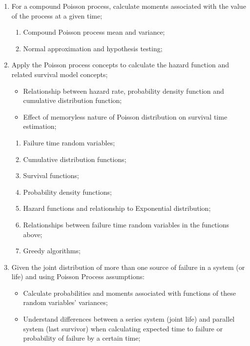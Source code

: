 \documentclass[12pt, titlepage, french]{report}
\begin{document}
\begin{outcomes}
\begin{enumerate}
\begin{knowledge}
\begin{enumerate}[label = \alph*.]
	\end{enumerate}
	\end{knowledge}
\tcbline
	\item	For a compound Poisson process, calculate moments associated with the value of the process at a given time;
	\begin{knowledge}
	\begin{enumerate}[label = \alph*.]
		\item	Compound Poisson process mean and variance;
		\item	Normal approximation and hypothesis testing;
	\end{enumerate}
	\end{knowledge}
\tcbline
	\item	Apply the Poisson process concepts to calculate the hazard function and related survival model concepts;
		\begin{itemize}
		\item	Relationship between hazard rate, probability density function and cumulative distribution function;
		\item	Effect of memoryless nature of Poisson distribution on survival time estimation;
		\end{itemize}
	\begin{knowledge}
	\begin{enumerate}[label = \alph*.]
		\item	Failure time random variables;
		\item	Cumulative distribution functions;
		\item	Survival functions;
		\item	Probability density functions;
		\item	Hazard functions and relationship to Exponential distribution;
		\item	Relationships between failure time random variables in the functions above;
		\item	Greedy algorithms;
	\end{enumerate}
	\end{knowledge}
\tcbline
	\item	Given the joint distribution of more than one source of failure in a system (or life) and using Poisson Process assumptions:
		\begin{itemize}
		\item	Calculate probabilities and moments associated with functions of these random variables' variances;
		\item	Understand differences between a series system (joint life) and parallel system (last survivor) when calculating expected time to failure or probability of failure by a certain time;

\end{itemize}
\end{enumerate}
\end{outcomes}
\end{document}
